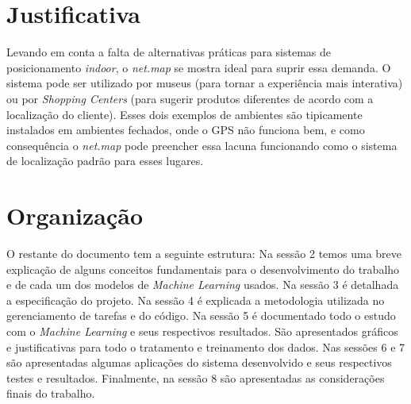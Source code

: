 \section{Justificativa}\label{sec:justify}
Levando em conta a falta de alternativas práticas para sistemas de posicionamento \textit{indoor}, o \textit{net.map} se mostra ideal para suprir essa demanda. O sistema pode ser utilizado por museus (para tornar a experiência mais interativa) ou por \textit{Shopping Centers}  (para sugerir produtos diferentes de acordo com a localização do cliente). Esses dois exemplos de ambientes são tipicamente instalados em ambientes fechados, onde o GPS não funciona bem, e como consequência o \textit{net.map} pode preencher essa lacuna funcionando como o sistema de localização padrão para esses lugares.

\section{Organização}\label{sec:organization}

O restante do documento tem a seguinte estrutura: Na sessão 2 temos uma breve explicação de alguns conceitos fundamentais para o desenvolvimento do trabalho e de cada um dos modelos de \textit{Machine Learning} usados. Na sessão 3 é detalhada a especificação do projeto. Na sessão 4 é explicada a metodologia utilizada no gerenciamento de tarefas e do código. Na sessão 5 é documentado todo o estudo com o \textit{Machine Learning} e seus respectivos resultados. São apresentados gráficos e justificativas para todo o tratamento e treinamento dos dados. Nas sessões 6 e 7 são apresentadas algumas aplicações do sistema desenvolvido e seus respectivos testes e resultados. Finalmente, na sessão 8 são apresentadas as considerações finais do trabalho.